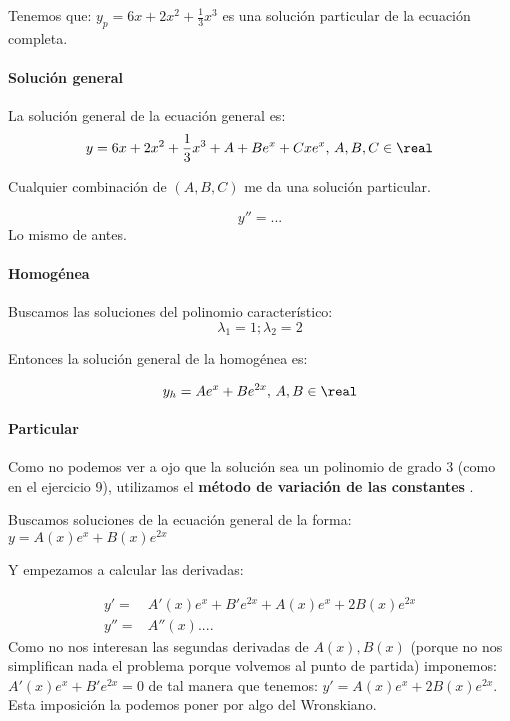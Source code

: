 \documentclass[nochap]{apuntes}
\begin{document}
\begin{problem}[9]
Tenemos que: $y_p = 6x+2x^2 + \frac{1}{3} x^3$ es una solución particular de la ecuación completa.

\paragraph{Solución general}

La solución general de la ecuación general es:
\[y = 6x+2x^2+\frac{1}{3}x^3+A+Be^x + Cxe^x,\, A,B,C\in\real\]

Cualquier combinación de $(A,B,C)$ me da una solución particular.

\end{problem}

\begin{problem}[14]
\[y''=...\]
\solution
Lo mismo de antes.

\paragraph{Homogénea}

Buscamos las soluciones del polinomio característico:
\[\lambda_1 = 1; \lambda_2 = 2\]

Entonces la solución general de la homogénea es:

\[y_h= Ae^x + Be^{2x},\,A,B\in\real\]

\paragraph{Particular}

Como no podemos ver a ojo que la solución sea un polinomio de grado 3 (como en el ejercicio 9), utilizamos el \textbf{método de variación de las constantes} .

Buscamos soluciones de la ecuación general de la forma:
$y=A(x)e^x + B(x)e^{2x}$

Y empezamos a calcular las derivadas:

\[\begin{array}{cc}
y' = &A'(x) e^x + B'e^{2x} + A(x)e^x + 2B(x)e^{2x}\\
y'' = &A''(x)....
\end{array}\]
Como no nos interesan las segundas derivadas de $A(x),B(x)$ (porque no nos simplifican nada el problema porque volvemos al punto de partida) imponemos: $A'(x) e^x + B'e^{2x} =0$ de tal manera que tenemos: $y' = A(x)e^x + 2B(x)e^{2x}$. Esta imposición la podemos poner por algo del Wronskiano.



\end{problem}
\end{document}

